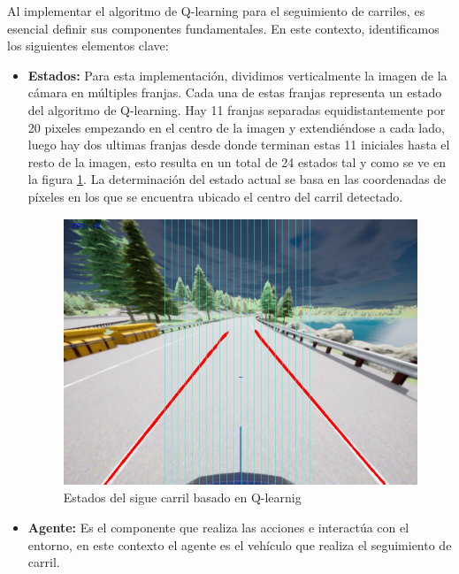 \bigskip

Al implementar el algoritmo de Q-learning para el seguimiento de carriles, es esencial definir sus componentes fundamentales. En este contexto, identificamos los siguientes elementos clave:
\bigskip


\begin{itemize}
    \item \textbf{Estados:} Para esta implementación, dividimos verticalmente la imagen de la cámara en múltiples franjas. Cada una de estas franjas representa un estado del algoritmo de Q-learning. Hay 11 franjas separadas equidistantemente por 20 pixeles empezando en el centro de la imagen y extendiéndose a cada lado, luego hay dos ultimas franjas desde donde terminan estas 11 iniciales hasta el resto de la imagen, esto resulta en un total de 24 estados tal y como se ve en la figura \ref{fig:Estados del algoritmo de Q-learnig}. La determinación del estado actual se basa en las coordenadas de píxeles en los que se encuentra ubicado el centro del carril detectado.
  
  \begin{figure}[h]
    \centering
    \includegraphics[height=8cm]{imagenes/cap4/estados_qlearnig.png}
    \caption{Estados del sigue carril basado en Q-learnig}
    \label{fig:Estados del algoritmo de Q-learnig}
\end{figure}
    
    \newpage 
    
    \item \textbf{Agente:} Es el componente que realiza las acciones e interactúa con el entorno, en este contexto el agente es el vehículo que realiza el seguimiento de carril.
    

\end{itemize}
